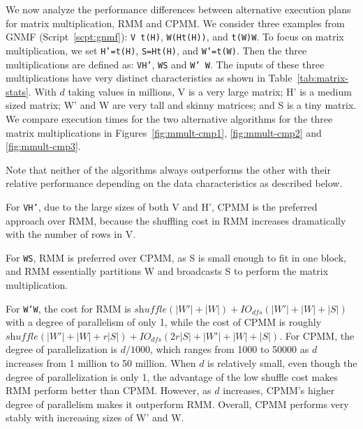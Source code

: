  We now analyze the performance differences between alternative execution plans for matrix multiplication, RMM and CPMM. We consider three examples from GNMF (Script~\ref{scpt:gnmf}): \texttt{V\mmult
  t(H)}, \texttt{W\mmult (H\mmult t(H))}, and \texttt{t(W)\mmult W}. To focus on
matrix multiplication, we set \texttt{H'=t(H)}, \texttt{S=H\mmult t(H)}, and \texttt{W'=t(W)}. Then the
three multiplications are defined as: \texttt{V\mmult H'}, \texttt{W\mmult S} and \texttt{W'\mmult
  W}. The inputs of these three multiplications have very distinct characteristics as shown in
Table~\ref{tab:matrix-stats}. With $d$ taking values in millions, V is a very large matrix; H' is a
medium sized matrix; W' and W are very tall and skinny matrices; and S is a tiny matrix. We compare execution times for
the two alternative algorithms for the three matrix multiplications in Figures~\ref{fig:mmult-cmp1},
\ref{fig:mmult-cmp2} and \ref{fig:mmult-cmp3}.

Note that neither of the algorithms always outperforms the other with their relative performance depending
on the data characteristics as described below.

For \texttt{V\mmult H'}, due to the large sizes of both V and H', CPMM is the preferred
approach over RMM, because the shuffling cost in RMM increases dramatically with the number of rows
in V. 

For \texttt{W\mmult S}, RMM is preferred over CPMM, as S is small enough
to fit in one block, and RMM essentially partitions W and broadcasts S to perform the matrix
multiplication. 

For \texttt{W'\mmult W}, the cost for RMM is $\textit{shuffle}(|W'|+|W|)+IO_{dfs}(|W'|+|W|+|S|)$ with a degree of parallelism of only 1, while the
cost of CPMM is roughly $\textit{shuffle}(|W'|+|W|+r|S|)+IO_{dfs}(2r|S|+|W'|+|W|+|S|)$. For CPMM, the degree of parallelization is $d/1000$, which ranges from 1000 to 50000 as $d$
increases from 1 million to 50 million. When $d$ is relatively small, even though the degree of
parallelization is only 1, the advantage of the low shuffle cost makes RMM perform better than
CPMM. However, as $d$ increases, CPMM's higher degree of parallelism makes it outperform
RMM. Overall, CPMM performs very stably with increasing sizes of W' and W.

